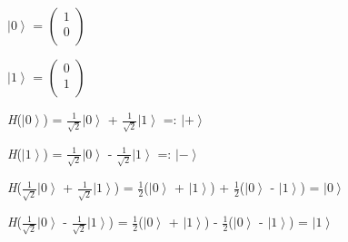 \documentclass[12pt]{letter}
\newcommand{\ket}[1]{$\left|{#1}\right\rangle$}
\newcommand{\bra}[1]{$\left\langle{#1}\right|$}
\newcommand{\braket}[2]{$\left\langle{#1}\middle|{#2}\right\rangle$}
\newcommand{\fract}[2]{$\frac{#1}{#2}$}
\newcommand{\matrixbraket}[2]{
	$\begin{pmatrix}
		#1 \\
		#2 \\
	\end{pmatrix}$
}
\begin{document}

\ket{0} = \matrixbraket{1}{0}
	
\ket{1} = \matrixbraket{0}{1}

\textit{H}(\ket{0}) = \fract{1}{\sqrt{2}}\ket{0} + \fract{1}{\sqrt{2}}\ket{1} =: \ket{+}

\textit{H}(\ket{1}) = \fract{1}{\sqrt{2}}\ket{0} - \fract{1}{\sqrt{2}}\ket{1} =: \ket{-}

\textit{H}(\fract{1}{\sqrt{2}}\ket{0} + \fract{1}{\sqrt{2}}\ket{1}) = \fract{1}{2}(\ket{0} + \ket{1}) + \fract{1}{2}(\ket{0} - \ket{1}) = \ket{0}

\textit{H}(\fract{1}{\sqrt{2}}\ket{0} - \fract{1}{\sqrt{2}}\ket{1}) = \fract{1}{2}(\ket{0} + \ket{1}) - \fract{1}{2}(\ket{0} - \ket{1}) = \ket{1}
\end{document}
